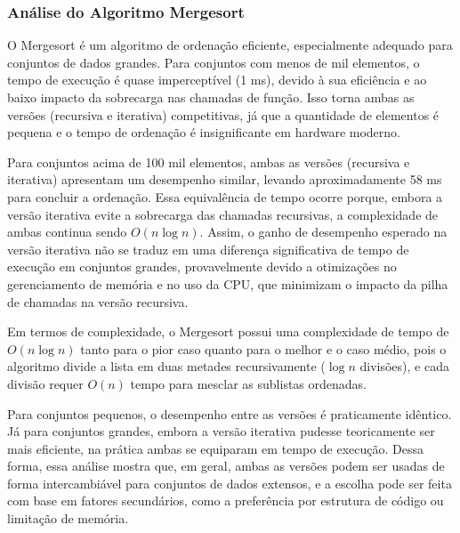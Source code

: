 \subsubsection{Análise do Algoritmo Mergesort} 

\hspace{0.6cm}O Mergesort é um algoritmo de ordenação eficiente, especialmente adequado para conjuntos de dados grandes. Para conjuntos com menos de mil elementos, o tempo de execução é quase imperceptível (1 ms), devido à sua eficiência e ao baixo impacto da sobrecarga nas chamadas de função. Isso torna ambas as versões (recursiva e iterativa) competitivas, já que a quantidade de elementos é pequena e o tempo de ordenação é insignificante em hardware moderno.

Para conjuntos acima de 100 mil elementos, ambas as versões (recursiva e iterativa) apresentam um desempenho similar, levando aproximadamente 58 ms para concluir a ordenação. Essa equivalência de tempo ocorre porque, embora a versão iterativa evite a sobrecarga das chamadas recursivas, a complexidade de ambas continua sendo \(O(n \log n)\). Assim, o ganho de desempenho esperado na versão iterativa não se traduz em uma diferença significativa de tempo de execução em conjuntos grandes, provavelmente devido a otimizações no gerenciamento de memória e no uso da CPU, que minimizam o impacto da pilha de chamadas na versão recursiva.

Em termos de complexidade, o Mergesort possui uma complexidade de tempo de \(O(n \log n)\) tanto para o pior caso quanto para o melhor e o caso médio, pois o algoritmo divide a lista em duas metades recursivamente (\(\log n\) divisões), e cada divisão requer \(O(n)\) tempo para mesclar as sublistas ordenadas.

Para conjuntos pequenos, o desempenho entre as versões é praticamente idêntico. Já para conjuntos grandes, embora a versão iterativa pudesse teoricamente ser mais eficiente, na prática ambas se equiparam em tempo de execução. Dessa forma, essa análise mostra que, em geral, ambas as versões podem ser usadas de forma intercambiável para conjuntos de dados extensos, e a escolha pode ser feita com base em fatores secundários, como a preferência por estrutura de código ou limitação de memória.
